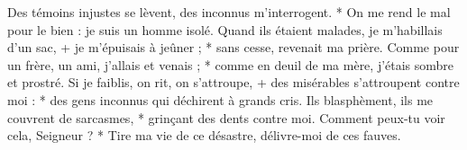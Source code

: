 Des témoins injustes se lèvent, des inconnus m'interrogent. *
\versseparator
On me rend le mal pour le bien : je suis un homme isolé.
\versseparator
Quand ils étaient malades, je m'habillais d'un sac, + je m'épuisais à jeûner ; * sans cesse, revenait ma prière.
\versseparator
Comme pour un frère, un ami, j'allais et venais ; * comme en deuil de ma mère, j'étais sombre et prostré.
\versseparator
Si je faiblis, on rit, on s'attroupe, + des misérables s'attroupent contre moi : * des gens inconnus qui déchirent à grands cris.
\versseparator
Ils blasphèment, ils me couvrent de sarcasmes, * grinçant des dents contre moi.
\versseparator
Comment peux-tu voir cela, Seigneur ? * Tire ma vie de ce désastre, délivre-moi de ces fauves.
